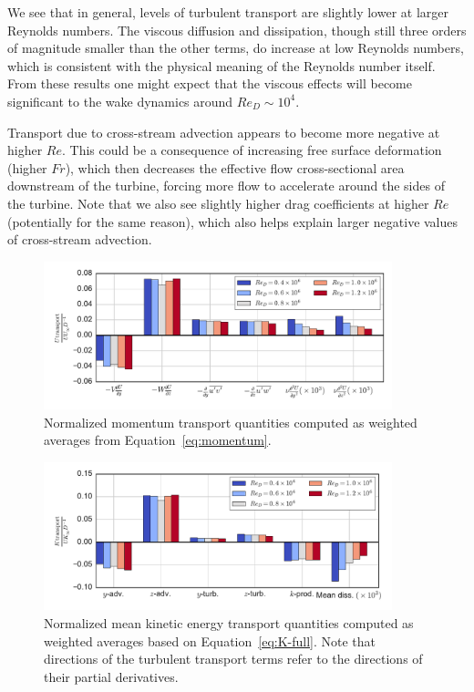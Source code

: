 \documentclass[energies,article,accept,moreauthors,pdftex,12pt,a4paper]{mdpi}
\begin{document}
We see that in general, levels of turbulent transport are slightly lower at
larger Reynolds numbers. The viscous diffusion and dissipation, though still
three orders of magnitude smaller than the other terms, do increase at low
Reynolds numbers, which is consistent with the physical meaning of the Reynolds
number itself. From these results one might expect that the viscous effects will
become significant to the wake dynamics around $Re_D \sim 10^4$.

Transport due to cross-stream advection appears to become more negative at
higher $Re$. This could be a consequence of increasing free surface deformation
(higher $Fr$), which then decreases the effective flow cross-sectional area
downstream of the turbine, forcing more flow to accelerate around the sides of
the turbine. Note that we also see slightly higher drag coefficients at higher
$Re$ (potentially for the same reason), which also helps explain larger negative
values of cross-stream advection.

\begin{figure}[ht!]
    \centering
    
    \includegraphics[width=0.9\textwidth]{figures/mom_bar_graph}
    
    \caption{Normalized momentum transport quantities computed as weighted
        averages from Equation~\ref{eq:momentum}.}
    
    \label{fig:mom-bar-graph}
\end{figure}

\begin{figure}[ht!]
    \centering
    
    \includegraphics[width=0.9\textwidth]{figures/K_trans_bar_graph}
    
    \caption{Normalized mean kinetic energy transport quantities computed as
        weighted averages based on Equation~\ref{eq:K-full}. Note that directions of
        the turbulent transport terms refer to the directions of their partial
        derivatives.}
    
    \label{fig:K-bar-graph}
\end{figure}
\end{document}
